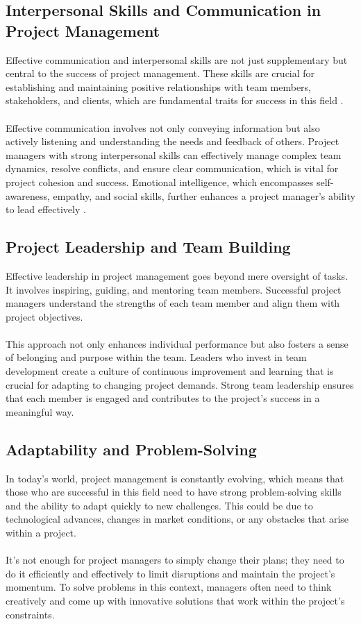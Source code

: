 \documentclass{article}
\begin{document}
\subsection{Interpersonal Skills and Communication in Project Management}
Effective communication and interpersonal skills are not just supplementary but central to the success of project management. These skills are crucial for establishing and maintaining positive relationships with team members, stakeholders, and clients, which are fundamental traits for success in this field \cite{Interpersonal_skills}.\\\\
Effective communication involves not only conveying information but also actively listening and understanding the needs and feedback of others. Project managers with strong interpersonal skills can effectively manage complex team dynamics, resolve conflicts, and ensure clear communication, which is vital for project cohesion and success. Emotional intelligence, which encompasses self-awareness, empathy, and social skills, further enhances a project manager's ability to lead effectively \cite{Warner_Mark}.\\

\subsection{Project Leadership and Team Building}
Effective leadership in project management goes beyond mere oversight of tasks. It involves inspiring, guiding, and mentoring team members. Successful project managers understand the strengths of each team member and align them with project objectives.\\
\\This approach not only enhances individual performance but also fosters a sense of belonging and purpose within the team. Leaders who invest in team development create a culture of continuous improvement and learning that is crucial for adapting to changing project demands. Strong team leadership ensures that each member is engaged and contributes to the project's success in a meaningful way\cite{Project_Management}.


\subsection{Adaptability and Problem-Solving}
In today's world, project management is constantly evolving, which means that those who are successful in this field need to have strong problem-solving skills and the ability to adapt quickly to new challenges. This could be due to technological advances, changes in market conditions, or any obstacles that arise within a project. \\\\It's not enough for project managers to simply change their plans; they need to do it efficiently and effectively to limit disruptions and maintain the project's momentum. To solve problems in this context, managers often need to think creatively and come up with innovative solutions that work within the project's constraints.\cite{Project_Management_Leadership}
\end{document}
